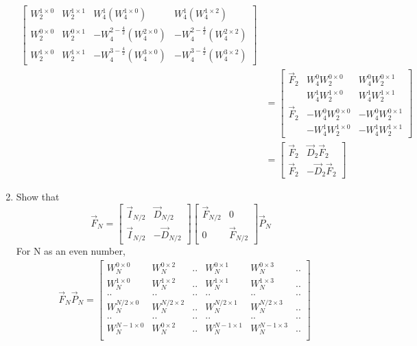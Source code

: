 \documentclass[journal,12pt,twocolumn]{IEEEtran}
\renewcommand\thesection{\arabic{section}}
\begin{document}
\begin{enumerate}[label=\arabic*.,ref=\thesection.\theenumi]
\begin{align}
\begin{bmatrix}
	W_2^{1\times0}&W_2^{1\times1}&W_4^1\left(W_4^{1\times0}\right)&W_4^1\left(W_4^{1\times2}\right)\\
	W_2^{0\times0}&W_2^{0\times1}&-W_4^{2-\frac{4}{2}}\left(W_4^{2\times0}\right)&-W_4^{2-\frac{4}{2}}\left(W_4^{2\times2}\right)\\
	W_2^{1\times0}&W_2^{1\times1}&-W_4^{3-\frac{4}{2}}\left(W_4^{3\times0}\right)&-W_4^{3-\frac{4}{2}}\left(W_4^{3\times2}\right)
\end{bmatrix}\\
&=\begin{bmatrix}
	\vec{F}_2&W_4^0W_2^{0\times0}&W_4^0W_2^{0\times1}\\
	&W_4^1W_2^{1\times0}&W_4^1W_2^{1\times1}\\
	\vec{F}_2&-W_4^0W_2^{0\times0}&-W_4^0W_2^{0\times1}\\
	&-W_4^1W_2^{1\times0}&-W_4^1W_2^{1\times1}
\end{bmatrix}\\
&=\begin{bmatrix}
	\vec{F}_2&\vec{D}_2\vec{F}_2\\
	\vec{F}_2&-\vec{D}_2\vec{F}_2
\end{bmatrix}
\end{align}
	\item Show that 
	\begin{equation}
		\vec{F}_{N}=
		\begin{bmatrix}
			\vec{I}_{N/2} & \vec{D}_{N/2} \\
			\vec{I}_{N/2} & -\vec{D}_{N/2}
		\end{bmatrix}
		\begin{bmatrix}
			\vec{F}_{N/2} & 0 \\
			0 & \vec{F}_{N/2}
		\end{bmatrix}
		\vec{P}_{N}
	\end{equation}
\solution For N  as an even number,
\begin{align}
	&\vec{F}_N\vec{P}_N=\begin{bmatrix}
		W_N^{0\times0}&W_N^{0\times2}&..&W_N^{0\times1}&W_N^{0\times3}&..\\
		W_N^{1\times0}&W_N^{1\times2}&..&W_N^{1\times1}&W_N^{1\times3}&..\\
		..&..&..&..&..&..\\
		W_N^{N/2\times0}&W_N^{N/2\times2}&..&W_N^{N/2\times1}&W_N^{N/2\times3}&..\\
		..&..&..&..&..&..\\
		W_N^{N-1\times0}&W_N^{0\times2}&..&W_N^{N-1\times1}&W_N^{N-1\times3}&..\\

\end{bmatrix}
\end{align}
\end{enumerate}
\end{document}
